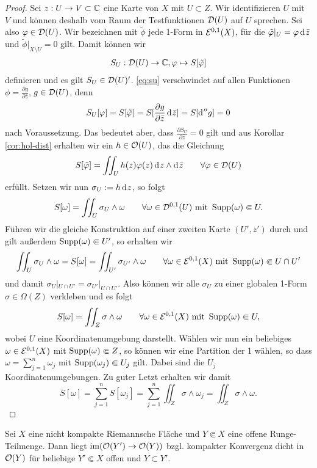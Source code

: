 \begin{proof}
  Sei $z: U \rightarrow V \subset \mathbb{C}$ eine Karte von $X$ mit $U \subset
  Z$. Wir identifizieren $U$ mit $V$ und können deshalb vom Raum der
  Testfunktionen $\mathcal{D}(U)$ auf $U$ sprechen. Sei also $\varphi \in
  \mathcal{D}(U)$. Wir bezeichnen mit $\tilde \phi$ jede 1-Form in
  $\mathcal{E}^{0,1}(X)$, für die $\tilde \phi|_U = \phi \d[\bar z]$ und
  $\tilde \phi |_{X \setminus U} = 0$ gilt. 
  Damit können wir 
  \begin{align}
  S_U: \mathcal{D}(U) \rightarrow \mathbb{C}, \varphi \mapsto S[\tilde {\varphi}] \label{eq:su}
  \end{align}
  definieren und es gilt $S_U \in \mathcal{D}(U)'$.
  \eqref{eq:su} verschwindet auf allen Funktionen $\phi = \frac{\partial
    g}{\partial \bar z}$, $g \in \mathcal{D}(U)$, denn
  \[
  S_U[\phi] = S[\tilde \phi] = S[ \frac{\partial g}{\partial \bar z}
  \d[\bar z]] = S[\d[''g]] = 0
  \]
  nach Voraussetzung. Das bedeutet aber, dass
  $\frac{\partial S_U}{\partial \bar z} = 0$ gilt und aus Korollar
  \ref{cor:hol-dist} erhalten wir ein $h \in \mathcal{O}(U)$, das die Gleichung
  \[
  S[\tilde \phi] = \iint_U h(z) \phi(z) \d[z] \wedge \d[\bar z] \qquad
  \forall \phi \in \dist(U)
  \]
  erfüllt. Setzen wir nun $\sigma_U := h \d[z]$, so folgt
  \[
  S[\omega] = \iint_U \sigma_U \wedge \omega \qquad \forall \omega \in
  \mathcal{D}^{0,1}(U) \text{ mit } \operatorname{Supp}(\omega) \Subset U.
  \]
  Führen wir die gleiche Konstruktion auf einer zweiten Karte $(U', z')$
  durch und gilt außerdem $\operatorname{Supp}(\omega) \Subset U'$, so
  erhalten wir
  \[
  \iint_U \sigma_U \wedge \omega = S[\omega] = \iint_{U'} \sigma_{U'}
  \wedge \omega \qquad \forall \omega \in \mathcal{E}^{0,1}(X) \text{ mit }
  \operatorname{Supp}(\omega) \Subset U \cap U'
  \]
  und damit $\sigma_U|_{U \cap U'} = \sigma_{U'}|_{U \cap
    U'}$. Also können wir alle $\sigma_U$ zu einer globalen 1-Form
  $\sigma \in \Omega(Z)$ verkleben und es folgt
  \[
  S[\omega] = \iint_Z \sigma \wedge \omega \qquad \forall \omega \in
  \mathcal{E}^{0,1}(X) \text{ mit } \operatorname{Supp}(\omega) \Subset U,
  \]
  wobei $U$ eine Koordinatenumgebung darstellt. 
  Wählen wir nun ein beliebiges $\omega \in \mathcal{E}^{0,1}(X)$ mit
  $\operatorname{Supp}(\omega) \Subset Z$, so können wir eine Partition der 1
  wählen, so dass $\omega = \sum_{j=1}^n \omega_j$ mit
  $\operatorname{Supp}(\omega_j) \Subset U_j$ gilt. Dabei sind die $U_j$
  Koordinatenumgebungen. 
  Zu guter Letzt erhalten wir damit
  \[
  S[\omega] = \sum_{j=1}^n S[\omega_j] = \sum_{j=1}^n \iint_Z \sigma
  \wedge \omega_j = \iint_Z \sigma \wedge \omega.
  \]
\end{proof}

\begin{thm}
  \label{thm:runge-dicht}
  Sei $X$ eine nicht kompakte Riemannsche Fläche und $Y \Subset X$
  eine offene Runge-Teilmenge. 
  Dann liegt $\operatorname{im}( \mathcal{O}(Y') \rightarrow \mathcal{O}(Y))$ bzgl. kompakter Konvergenz dicht in $\mathcal{O}(Y)$ für beliebige $Y' \Subset X$
  offen und $Y \subset Y'$.
\end{thm}

